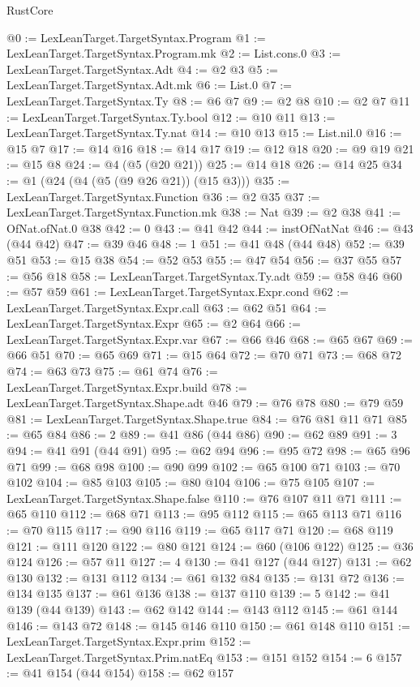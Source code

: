 \begin{lexlean}{RustCore}
\begin{coremodule}
@0 := LexLeanTarget.TargetSyntax.Program
@1 := LexLeanTarget.TargetSyntax.Program.mk
@2 := List.cons.{0}
@3 := LexLeanTarget.TargetSyntax.Adt
@4 := @2 @3
@5 := LexLeanTarget.TargetSyntax.Adt.mk
@6 := List.{0}
@7 := LexLeanTarget.TargetSyntax.Ty
@8 := @6 @7
@9 := @2 @8
@10 := @2 @7
@11 := LexLeanTarget.TargetSyntax.Ty.bool
@12 := @10 @11
@13 := LexLeanTarget.TargetSyntax.Ty.nat
@14 := @10 @13
@15 := List.nil.{0}
@16 := @15 @7
@17 := @14 @16
@18 := @14 @17
@19 := @12 @18
@20 := @9 @19
@21 := @15 @8
@24 := @4 (@5 (@20 @21))
@25 := @14 @18
@26 := @14 @25
@34 := @1 (@24 (@4 (@5 (@9 @26 @21)) (@15 @3)))
@35 := LexLeanTarget.TargetSyntax.Function
@36 := @2 @35
@37 := LexLeanTarget.TargetSyntax.Function.mk
@38 := Nat
@39 := @2 @38
@41 := OfNat.ofNat.{0} @38
@42 := 0
@43 := @41 @42
@44 := instOfNatNat
@46 := @43 (@44 @42)
@47 := @39 @46
@48 := 1
@51 := @41 @48 (@44 @48)
@52 := @39 @51
@53 := @15 @38
@54 := @52 @53
@55 := @47 @54
@56 := @37 @55
@57 := @56 @18
@58 := LexLeanTarget.TargetSyntax.Ty.adt
@59 := @58 @46
@60 := @57 @59
@61 := LexLeanTarget.TargetSyntax.Expr.cond
@62 := LexLeanTarget.TargetSyntax.Expr.call
@63 := @62 @51
@64 := LexLeanTarget.TargetSyntax.Expr
@65 := @2 @64
@66 := LexLeanTarget.TargetSyntax.Expr.var
@67 := @66 @46
@68 := @65 @67
@69 := @66 @51
@70 := @65 @69
@71 := @15 @64
@72 := @70 @71
@73 := @68 @72
@74 := @63 @73
@75 := @61 @74
@76 := LexLeanTarget.TargetSyntax.Expr.build
@78 := LexLeanTarget.TargetSyntax.Shape.adt @46
@79 := @76 @78
@80 := @79 @59
@81 := LexLeanTarget.TargetSyntax.Shape.true
@84 := @76 @81 @11 @71
@85 := @65 @84
@86 := 2
@89 := @41 @86 (@44 @86)
@90 := @62 @89
@91 := 3
@94 := @41 @91 (@44 @91)
@95 := @62 @94
@96 := @95 @72
@98 := @65 @96 @71
@99 := @68 @98
@100 := @90 @99
@102 := @65 @100 @71
@103 := @70 @102
@104 := @85 @103
@105 := @80 @104
@106 := @75 @105
@107 := LexLeanTarget.TargetSyntax.Shape.false
@110 := @76 @107 @11 @71
@111 := @65 @110
@112 := @68 @71
@113 := @95 @112
@115 := @65 @113 @71
@116 := @70 @115
@117 := @90 @116
@119 := @65 @117 @71
@120 := @68 @119
@121 := @111 @120
@122 := @80 @121
@124 := @60 (@106 @122)
@125 := @36 @124
@126 := @57 @11
@127 := 4
@130 := @41 @127 (@44 @127)
@131 := @62 @130
@132 := @131 @112
@134 := @61 @132 @84
@135 := @131 @72
@136 := @134 @135
@137 := @61 @136
@138 := @137 @110
@139 := 5
@142 := @41 @139 (@44 @139)
@143 := @62 @142
@144 := @143 @112
@145 := @61 @144
@146 := @143 @72
@148 := @145 @146 @110
@150 := @61 @148 @110
@151 := LexLeanTarget.TargetSyntax.Expr.prim
@152 := LexLeanTarget.TargetSyntax.Prim.natEq
@153 := @151 @152
@154 := 6
@157 := @41 @154 (@44 @154)
@158 := @62 @157

\end{coremodule}
\end{lexlean}
